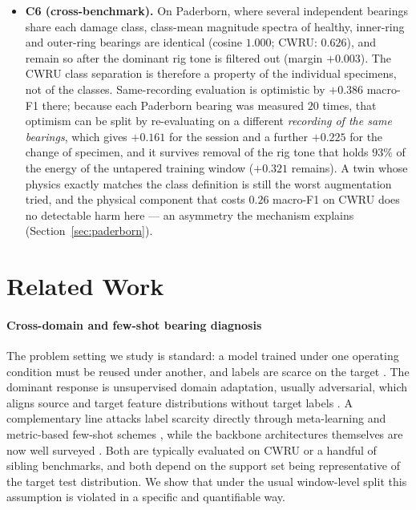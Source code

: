 \documentclass[journal]{IEEEtran}
\begin{document}
\begin{itemize}
transfers into load~3 at $0.69$--$0.80$. Conclusions drawn from the popular
S0$\rightarrow$S3 direction alone do not generalize
(Section~\ref{sec:protocol}).
\item \textbf{C6 (cross-benchmark).} On Paderborn, where several independent
bearings share each damage class, class-mean magnitude spectra of healthy,
inner-ring and outer-ring bearings are identical (cosine $1.000$; CWRU:
$0.626$), and remain so after the dominant rig tone is filtered out (margin
$+0.003$). The CWRU class separation is therefore a property of the individual
specimens, not of the classes. Same-recording evaluation is optimistic by
$+0.386$ macro-F1 there; because each Paderborn bearing was measured $20$
times, that optimism can be split by re-evaluating on a different
\emph{recording of the same bearings}, which gives $+0.161$ for the session
and a further $+0.225$ for the change of specimen, and it survives removal of
the rig tone that holds $93\%$ of the energy of the untapered training window
($+0.321$ remains). A twin whose physics
exactly matches the class definition is still the worst augmentation tried, and
the physical component that costs $0.26$ macro-F1 on CWRU does no detectable
harm here --- an asymmetry the mechanism explains
(Section~\ref{sec:paderborn}).
\end{itemize}

\section{Related Work}
\label{sec:related}

\paragraph{Cross-domain and few-shot bearing diagnosis}
The problem setting we study is standard: a model trained under one operating
condition must be reused under another, and labels are scarce on the target
\cite{lei2020roadmap, zhao2020benchmark}. The dominant response is unsupervised
domain adaptation, usually adversarial, which aligns source and target feature
distributions without target labels \cite{ganin2016dann, wang2018dasurvey,
zhao2021transfer}. A complementary line
attacks label scarcity directly through meta-learning and metric-based few-shot
schemes \cite{wang2020fewshot}, while the backbone architectures themselves are
now well surveyed \cite{jiao2020cnn}. Both are typically evaluated on CWRU or a
handful of sibling benchmarks, and both depend on the support set being
representative of the target test distribution. We show that under the usual
window-level split this assumption is violated in a specific and quantifiable
way.
\end{document}
